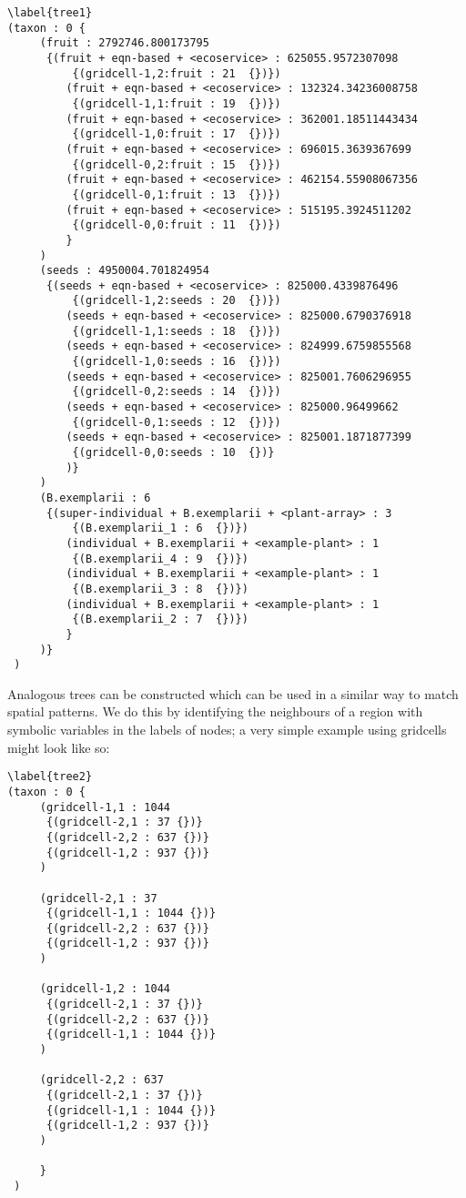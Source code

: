 \begin{verbatim}\label{tree1}
(taxon : 0 {
     (fruit : 2792746.800173795 
      {(fruit + eqn-based + <ecoservice> : 625055.9572307098 
          {(gridcell-1,2:fruit : 21  {})})
         (fruit + eqn-based + <ecoservice> : 132324.34236008758 
          {(gridcell-1,1:fruit : 19  {})})
         (fruit + eqn-based + <ecoservice> : 362001.18511443434 
          {(gridcell-1,0:fruit : 17  {})})
         (fruit + eqn-based + <ecoservice> : 696015.3639367699 
          {(gridcell-0,2:fruit : 15  {})})
         (fruit + eqn-based + <ecoservice> : 462154.55908067356 
          {(gridcell-0,1:fruit : 13  {})})
         (fruit + eqn-based + <ecoservice> : 515195.3924511202 
          {(gridcell-0,0:fruit : 11  {})})
         }
     )
     (seeds : 4950004.701824954 
      {(seeds + eqn-based + <ecoservice> : 825000.4339876496 
          {(gridcell-1,2:seeds : 20  {})})
         (seeds + eqn-based + <ecoservice> : 825000.6790376918 
          {(gridcell-1,1:seeds : 18  {})})
         (seeds + eqn-based + <ecoservice> : 824999.6759855568 
          {(gridcell-1,0:seeds : 16  {})})
         (seeds + eqn-based + <ecoservice> : 825001.7606296955 
          {(gridcell-0,2:seeds : 14  {})})
         (seeds + eqn-based + <ecoservice> : 825000.96499662 
          {(gridcell-0,1:seeds : 12  {})})
         (seeds + eqn-based + <ecoservice> : 825001.1871877399 
          {(gridcell-0,0:seeds : 10  {})}
         )}
     )
     (B.exemplarii : 6 
      {(super-individual + B.exemplarii + <plant-array> : 3 
          {(B.exemplarii_1 : 6  {})})
         (individual + B.exemplarii + <example-plant> : 1 
          {(B.exemplarii_4 : 9  {})})
         (individual + B.exemplarii + <example-plant> : 1 
          {(B.exemplarii_3 : 8  {})})
         (individual + B.exemplarii + <example-plant> : 1 
          {(B.exemplarii_2 : 7  {})})
         }
     )}
 )
\end{verbatim}

Analogous trees can be constructed which can be used in a similar way
to match spatial patterns. We do this by identifying the neighbours of
a region with symbolic variables in the labels of nodes; a very simple
example using gridcells might look like so:

\begin{verbatim}\label{tree2}
(taxon : 0 {
     (gridcell-1,1 : 1044
      {(gridcell-2,1 : 37 {})}
      {(gridcell-2,2 : 637 {})}
      {(gridcell-1,2 : 937 {})}
     )

     (gridcell-2,1 : 37
      {(gridcell-1,1 : 1044 {})}
      {(gridcell-2,2 : 637 {})}
      {(gridcell-1,2 : 937 {})}
     )

     (gridcell-1,2 : 1044
      {(gridcell-2,1 : 37 {})}
      {(gridcell-2,2 : 637 {})}
      {(gridcell-1,1 : 1044 {})}
     )

     (gridcell-2,2 : 637
      {(gridcell-2,1 : 37 {})}
      {(gridcell-1,1 : 1044 {})}
      {(gridcell-1,2 : 937 {})}
     )

     }
 )
\end{verbatim}

